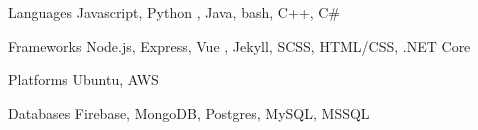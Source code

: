 

\begin{cvskills}

  \cvskill
    {Languages} %
    {Javascript, Python} %
    {, Java, bash, C++, C\#} %

  \cvskill
    {Frameworks} %
    {Node.js, Express, Vue} %
    {, Jekyll, SCSS, HTML/CSS, .NET Core} %

  \cvskill
    {Platforms} %
    {} %
    {Ubuntu, AWS} %

  \cvskill
    {Databases} %
    {} %
    {Firebase, MongoDB, Postgres, MySQL, MSSQL} %

\end{cvskills}
